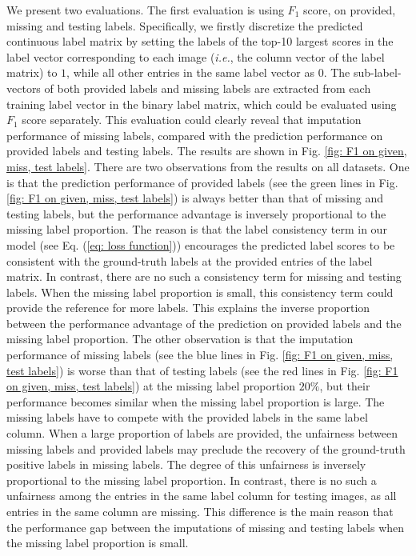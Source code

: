 \documentclass[twocolumn]{svjour3}          %
\begin{document}
We present two evaluations. 
The first evaluation is using $F_1$ score, on provided, missing and testing labels. Specifically, we firstly discretize the predicted continuous label matrix by setting the labels of the top-10 largest scores in the label vector corresponding to each image ({\it i.e.}, the column vector of the label matrix) to $1$, while all other entries in the same label vector as $0$. The sub-label-vectors of both provided labels and missing labels are extracted from each training label vector in the binary label matrix, which could be evaluated using $F_1$ score separately. 
This evaluation could clearly reveal that imputation performance of missing labels, compared with the prediction performance on provided labels and testing labels.   
The results are shown in Fig. \ref{fig: F1 on given, miss, test labels}. 
There are two observations from the results on all datasets. 
%
One is that the prediction performance of provided labels (see the green lines in Fig. \ref{fig: F1 on given, miss, test labels}) is always better than that of missing and testing labels, but the performance advantage is inversely proportional to the missing label proportion. 
The reason is that the label consistency term in our model (see Eq. (\ref{eq: loss function})) encourages the predicted label scores to be consistent with the ground-truth labels at the provided entries of the label matrix. In contrast, there are no such a consistency term for missing and testing labels. 
When the missing label proportion is small, this consistency term could provide the reference for more labels.  
This explains the inverse proportion between the performance advantage of the prediction on provided labels and the missing label proportion. 
%
The other observation is that the imputation performance of missing labels (see the blue lines in Fig. \ref{fig: F1 on given, miss, test labels}) is worse than that of testing labels (see the red lines in Fig. \ref{fig: F1 on given, miss, test labels}) at the missing label proportion $20\%$, but their performance becomes similar when the missing label proportion is large.
The missing labels have to compete with the provided labels in the same label column. When a large proportion of labels are provided, the unfairness between missing labels and provided labels may preclude the recovery of the ground-truth positive labels in missing labels. The degree of this unfairness is inversely proportional to the missing label proportion. 
In contrast, there is no such a unfairness among the entries in the same label column for testing images, as all entries in the same column are missing. 
This difference is the main reason that the performance gap between the imputations of missing and testing labels when the missing label proportion is small. 
\end{document}
